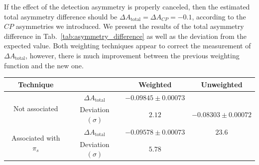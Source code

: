 \documentclass{article}
\begin{document}
        If the effect of the detection asymmetry is properly canceled, then the estimated total asymmetry difference should be $\Delta A_\text{total} = \Delta A_{CP} = -0.1$, according to the $CP$ asymmetries we introduced. 
        We present the results of the total asymmetry difference in Tab.~\ref{tab:asymmetry_difference} as well as the deviation from the expected value.
        Both weighting techniques appear to correct the measurement of $\Delta A_\text{total}$, however, there is much improvement between the previous weighting function and the new one.
        \begin{center}
                \begin{tabular}{c|c|c|c}
                        Technique& & Weighted & Unweighted\\
                        \hline\hline
                        \multirow{2}{*}{Not associated} & $\Delta A_\text{total}$ & $-0.09845 \pm 0.00073$ & \\
                        & Deviation $(\sigma)$ & $2.12$ & $-0.08303 \pm 0.00072$\\
                        \cline{1-3}
                        \multirow{2}{*}{Associated with $\pi_s$} & $\Delta A_\text{total}$ & $-0.09578 \pm 0.00073$ & $23.6$\\
                        & Deviation $(\sigma)$ & $5.78$ & \\
                \end{tabular}
                \label{tab:asymmetry_difference}
        \end{center}
\end{document}
